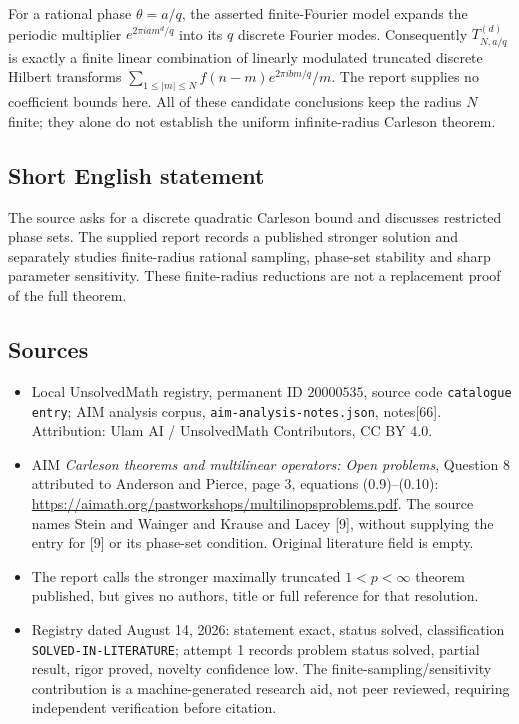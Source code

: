 \documentclass[11pt]{article}
\begin{document}
For a rational phase \(\theta=a/q\), the asserted finite-Fourier model expands the periodic multiplier \(e^{2\pi i a m^d/q}\) into its \(q\) discrete Fourier modes. Consequently \(T_{N,a/q}^{(d)}\) is exactly a finite linear combination of linearly modulated truncated discrete Hilbert transforms \(\sum_{1\le|m|\le N}f(n-m)e^{2\pi i b m/q}/m\). The report supplies no coefficient bounds here. All of these candidate conclusions keep the radius \(N\) finite; they alone do not establish the uniform infinite-radius Carleson theorem.
\subsection{Short English statement}
The source asks for a discrete quadratic Carleson bound and discusses restricted phase sets. The supplied report records a published stronger solution and separately studies finite-radius rational sampling, phase-set stability and sharp parameter sensitivity. These finite-radius reductions are not a replacement proof of the full theorem.
\subsection{Sources}
\begin{itemize}
\item Local UnsolvedMath registry, permanent ID \(20000535\), source code \texttt{catalogue entry}; AIM analysis corpus, \texttt{aim-analysis-notes.json}, notes[66]. Attribution: Ulam AI / UnsolvedMath Contributors, CC BY 4.0.
\item AIM \emph{Carleson theorems and multilinear operators: Open problems}, Question 8 attributed to Anderson and Pierce, page 3, equations (0.9)--(0.10): \url{https://aimath.org/pastworkshops/multilinopsproblems.pdf}. The source names Stein and Wainger and Krause and Lacey [9], without supplying the entry for [9] or its phase-set condition. Original literature field is empty.
\item The report calls the stronger maximally truncated \(1<p<\infty\) theorem published, but gives no authors, title or full reference for that resolution.
\item Registry dated August 14, 2026: statement exact, status solved, classification \texttt{SOLVED-IN-LITERATURE}; attempt 1 records problem status solved, partial result, rigor proved, novelty confidence low. The finite-sampling/sensitivity contribution is a machine-generated research aid, not peer reviewed, requiring independent verification before citation.
\end{itemize}
\end{document}
